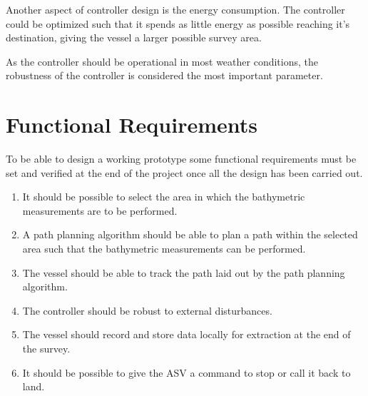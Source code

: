 Another aspect of controller design is the energy consumption. 
The controller could be optimized such that it spends as little energy as possible reaching it's destination, giving the vessel a larger possible survey area. 

As the controller should be operational in most weather conditions, the robustness of the controller is considered the most important parameter. 



\section{Functional Requirements} \label{sec:requirements}
To be able to design a working prototype some functional requirements must be set and verified at the end of the project once all the design has been carried out.
%
\begin{enumerate}
  \item It should be possible to select the area in which the bathymetric measurements are to be performed.
  \item A path planning algorithm should be able to plan a path within the selected area such that the bathymetric measurements can be performed.
  \item The vessel should be able to track the path laid out by the path planning algorithm.
  \item The controller should be robust to external disturbances.
  \item The vessel should record and store data locally for extraction at the end of the survey.
  \item It should be possible to give the ASV a command to stop or call it back to land.
\end{enumerate}
%






